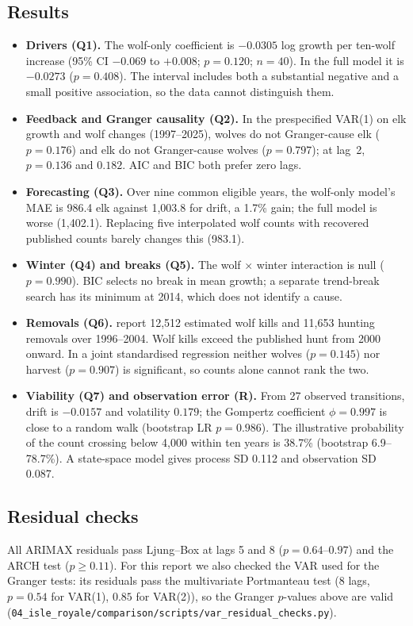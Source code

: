 \documentclass[11pt,a4paper]{article}
\begin{document}
\subsection{Results}
\begin{itemize}
\item \textbf{Drivers (Q1).} The wolf-only coefficient is $-0.0305$ log growth per ten-wolf increase (95\% CI $-0.069$ to $+0.008$; $p=0.120$; $n=40$). In the full model it is $-0.0273$ ($p=0.408$). The interval includes both a substantial negative and a small positive association, so the data cannot distinguish them.
\item \textbf{Feedback and Granger causality (Q2).} In the prespecified VAR(1) on elk growth and wolf changes (1997--2025), wolves do not Granger-cause elk ($p=0.176$) and elk do not Granger-cause wolves ($p=0.797$); at lag~2, $p=0.136$ and $0.182$. AIC and BIC both prefer zero lags.
\item \textbf{Forecasting (Q3).} Over nine common eligible years, the wolf-only model's MAE is 986.4 elk against 1{,}003.8 for drift, a 1.7\% gain; the full model is worse (1{,}402.1). Replacing five interpolated wolf counts with recovered published counts barely changes this (983.1).
\item \textbf{Winter (Q4) and breaks (Q5).} The wolf $\times$ winter interaction is null ($p=0.990$). BIC selects no break in mean growth; a separate trend-break search has its minimum at 2014, which does not identify a cause.
\item \textbf{Removals (Q6).} \citet{eberhardt2007} report 12{,}512 estimated wolf kills and 11{,}653 hunting removals over 1996--2004. Wolf kills exceed the published hunt from 2000 onward. In a joint standardised regression neither wolves ($p=0.145$) nor harvest ($p=0.907$) is significant, so counts alone cannot rank the two.
\item \textbf{Viability (Q7) and observation error (R).} From 27 observed transitions, drift is $-0.0157$ and volatility $0.179$; the Gompertz coefficient $\phi=0.997$ is close to a random walk (bootstrap LR $p=0.986$). The illustrative probability of the count crossing below 4{,}000 within ten years is 38.7\% (bootstrap 6.9--78.7\%). A state-space model gives process SD 0.112 and observation SD 0.087.
\end{itemize}

\subsection{Residual checks}
All ARIMAX residuals pass Ljung--Box at lags 5 and 8 ($p=0.64$--$0.97$) and the ARCH test ($p\ge0.11$). For this report we also checked the VAR used for the Granger tests: its residuals pass the multivariate Portmanteau test (8 lags, $p=0.54$ for VAR(1), $0.85$ for VAR(2)), so the Granger $p$-values above are valid (\texttt{04\_isle\_royale/comparison/scripts/var\_residual\_checks.py}).
\end{document}
